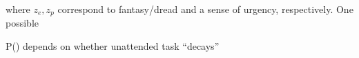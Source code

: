 \documentclass[
]{report}
\begin{document}
where \(z_e, z_p\) correspond to fantasy/dread and a sense of urgency,
respectively. One possible

P() depends on whether unattended task ``decays''

\begin{figure}

\begin{minipage}[t]{0.50\linewidth}

{\centering 


}

\end{minipage}%
%
\begin{minipage}[t]{0.50\linewidth}

{\centering 

\raisebox{-\height}{

}}
\end{minipage}
\end{figure}
\end{document}
